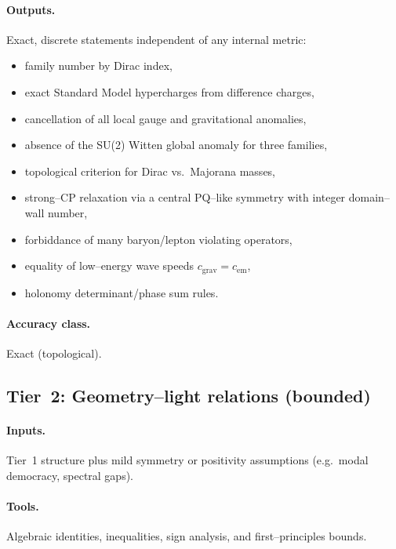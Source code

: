 \documentclass[11pt]{article}
\begin{document}
\paragraph{Outputs.}
Exact, discrete statements independent of any internal metric:
\begin{itemize}
  \item family number by Dirac index,
  \item exact Standard Model hypercharges from difference charges,
  \item cancellation of all local gauge and gravitational anomalies,
  \item absence of the SU(2) Witten global anomaly for three families,
  \item topological criterion for Dirac vs.\ Majorana masses,
  \item strong--CP relaxation via a central PQ--like symmetry with integer
        domain--wall number,
  \item forbiddance of many baryon/lepton violating operators,
  \item equality of low--energy wave speeds $c_{\mathrm{grav}}=c_{\mathrm{em}}$,
  \item holonomy determinant/phase sum rules.
\end{itemize}

\paragraph{Accuracy class.}
Exact (topological).

\subsection{Tier~2: Geometry--light relations (bounded)}

\paragraph{Inputs.}
Tier~1 structure plus mild symmetry or positivity assumptions (e.g.\
modal democracy, spectral gaps).

\paragraph{Tools.}
Algebraic identities, inequalities, sign analysis, and first--principles
bounds.
\end{document}
